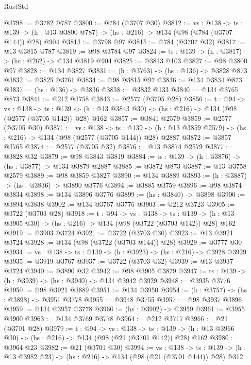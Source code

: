 \begin{lexlean}{RustStd}
\begin{coremodule}
{\begin{coremodule}
{{{{{{{{{{@3798 := @3782 @787
@3800 := @784 (@3707 @30)
@3812 := {vs : @138} ->
  {ts : @139} -> (h : @13 @3800 @787) -> (hs : @216) -> @134 (@98 (@784 (@3707 @144)) @28) @904
@3813 := @3798 @97
@3815 := @784 (@3707 @32)
@3817 := @13 @3815 @787
@3819 := @98 @3784 @97
@3824 := {ts : @139} -> (h : @3817) -> (hs : @262) -> @134 @3819 @904
@3825 := @3813 @103
@3827 := @98 @3800 @97
@3828 := @134 @3827
@3831 := (h : @3763) -> (hs : @136) -> @3828 @873
@3832 := @3825 @3761
@3834 := @98 @3815 @97
@3836 := @134 @3834 @873
@3837 := (hs : @136) -> @3836
@3838 := @3832 @133
@3840 := @134 @3765 @873
@3841 := @212 @3758
@3843 := @2577 (@3705 @28)
@3856 := {t : @94} ->
  {vs : @138} ->
  {ts : @139} -> (h : @13 @3843 @30) -> (hs : @216) -> @134 (@98 (@2577 (@3705 @142)) @28) @162
@3857 := @3841 @2579
@3859 := @2577 (@3705 @30)
@3871 := {vs : @138} ->
  {ts : @139} -> (h : @13 @3859 @2579) -> (hs : @216) -> @134 (@98 (@2577 (@3705 @144)) @28) @2887
@3872 := @3857 @3765
@3874 := @2577 (@3705 @32)
@3876 := @13 @3874 @2579
@3877 := @3828 @32
@3879 := @98 @3843 @3819
@3884 := {ts : @139} -> (h : @3876) -> (hs : @3877) -> @134 @3879 @2887
@3885 := @3872 @873
@3887 := @13 @3758 @2579
@3889 := @98 @3859 @3827
@3890 := @134 @3889
@3893 := (h : @3887) -> (hs : @3836) -> @3890 @3776
@3894 := @3885 @3759
@3896 := @98 @3874 @3834
@3898 := @134 @3896 @3776
@3899 := (hs : @3840) -> @3898
@3900 := @3894 @3838
@3902 := @134 @3767 @3776
@3903 := @212 @3723
@3905 := @3722 (@3703 @28)
@3918 := {t : @94} ->
  {vs : @138} ->
  {ts : @139} -> (h : @13 @3905 @30) -> (hs : @216) -> @134 (@98 (@3722 (@3703 @142)) @28) @162
@3919 := @3903 @3724
@3921 := @3722 (@3703 @30)
@3923 := @13 @3921 @3724
@3928 := @134 (@98 (@3722 (@3703 @144)) @28)
@3929 := @3777 @30
@3934 := {vs : @138} -> {ts : @139} -> (h : @3923) -> (hs : @216) -> @3928 @3929
@3935 := @3919 @3767
@3937 := @3722 (@3703 @32)
@3939 := @13 @3937 @3724
@3940 := @3890 @32
@3942 := @98 @3905 @3879
@3947 := {ts : @139} -> (h : @3939) -> (hs : @3940) -> @134 @3942 @3929
@3948 := @3935 @3776
@3950 := @98 @3921 @3889
@3951 := @134 @3950
@3954 := (h : @3757) -> (hs : @3898) -> @3951 @3778
@3955 := @3948 @3755
@3957 := @98 @3937 @3896
@3959 := @134 @3957 @3778
@3960 := (hs : @3902) -> @3959
@3961 := @3955 @3900
@3963 := @134 @3769 @3778
@3964 := @212 @3717
@3966 := @21 (@3701 @28)
@3979 := {t : @94} ->
  {vs : @138} ->
  {ts : @139} -> (h : @13 @3966 @30) -> (hs : @216) -> @134 (@98 (@21 (@3701 @142)) @28) @162
@3980 := @3964 @23
@3982 := @21 (@3701 @30)
@3994 := {vs : @138} ->
  {ts : @139} -> (h : @13 @3982 @23) -> (hs : @216) -> @134 (@98 (@21 (@3701 @144)) @28) @312
}}}}}}}}}}
\end{coremodule}}
\end{coremodule}
\end{lexlean}
